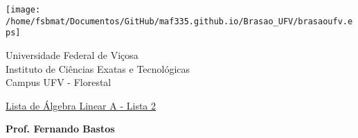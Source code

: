 \documentclass{report}
\begin{document}
\vspace*{-2cm}

\begin{center}
\begin{minipage}[s]{2cm}
\hspace{-1.3cm}\texttt{[image: /home/fsbmat/Documentos/GitHub/maf335.github.io/Brasao\_UFV/brasaoufv.eps]}
\end{minipage}
\begin{minipage}[s]{13cm}
{\begin{center} {\sc \Large Universidade Federal de Vi\c{c}osa}\\
{\sc \large Instituto de Ci\^encias Exatas e Tecnológicas}\\
{\sc \large Campus UFV - Florestal}\\
\end{center}}
\end{minipage}\begin{minipage}[s]{2 cm}
\end{minipage}
\end{center}

\vspace{-0.3cm}



\medskip

\begin{center}

\underline{\underline{{\large{\sc Lista de Álgebra Linear A - Lista 2}}}}

\bigskip

{\large {\bf Prof. Fernando Bastos}}
%
\end{center}
\end{document}
